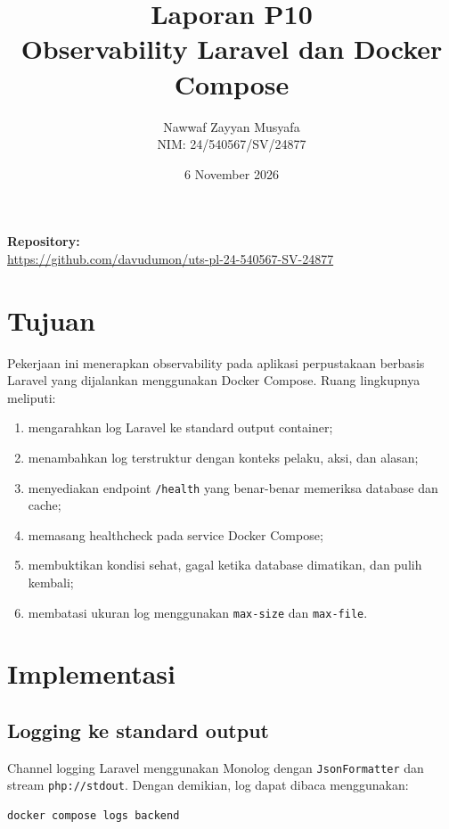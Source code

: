 \documentclass[12pt,a4paper]{article}
\title{
  \textbf{Laporan P10}\\
  \large Observability Laravel dan Docker Compose
}
\author{
  Nawwaf Zayyan Musyafa\\
  NIM: 24/540567/SV/24877
}
\date{6 November 2026}
\begin{document}
\maketitle
\thispagestyle{empty}

\begin{center}
\textbf{Repository:}\\
\url{https://github.com/davudumon/uts-pl-24-540567-SV-24877}
\end{center}

\tableofcontents
\newpage

\section{Tujuan}

Pekerjaan ini menerapkan observability pada aplikasi perpustakaan berbasis Laravel
yang dijalankan menggunakan Docker Compose. Ruang lingkupnya meliputi:

\begin{enumerate}[label=\arabic*.]
  \item mengarahkan log Laravel ke standard output container;
  \item menambahkan log terstruktur dengan konteks pelaku, aksi, dan alasan;
  \item menyediakan endpoint \texttt{/health} yang benar-benar memeriksa database dan cache;
  \item memasang healthcheck pada service Docker Compose;
  \item membuktikan kondisi sehat, gagal ketika database dimatikan, dan pulih kembali;
  \item membatasi ukuran log menggunakan \texttt{max-size} dan \texttt{max-file}.
\end{enumerate}

\section{Implementasi}

\subsection{Logging ke standard output}

Channel logging Laravel menggunakan Monolog dengan \texttt{JsonFormatter} dan stream
\texttt{php://stdout}. Dengan demikian, log dapat dibaca menggunakan:

\begin{verbatim}
docker compose logs backend
\end{verbatim}
\end{document}
